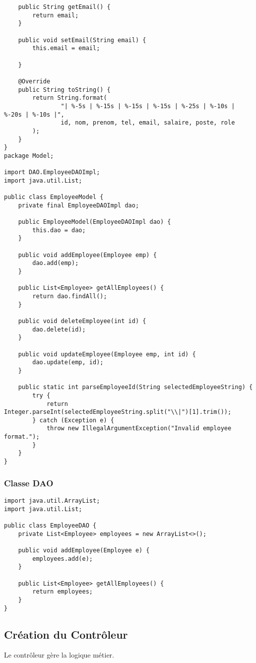 \documentclass[12pt,a4paper]{article}
\begin{document}
\begin{lstlisting}
    public String getEmail() {
        return email;
    }

    public void setEmail(String email) {
        this.email = email;

    }

    @Override
    public String toString() {
        return String.format(
                "| %-5s | %-15s | %-15s | %-15s | %-25s | %-10s | %-20s | %-10s |",
                id, nom, prenom, tel, email, salaire, poste, role
        );
    }
}
package Model;

import DAO.EmployeeDAOImpl;
import java.util.List;

public class EmployeeModel {
    private final EmployeeDAOImpl dao;

    public EmployeeModel(EmployeeDAOImpl dao) {
        this.dao = dao;
    }

    public void addEmployee(Employee emp) {
        dao.add(emp);
    }

    public List<Employee> getAllEmployees() {
        return dao.findAll();
    }

    public void deleteEmployee(int id) {
        dao.delete(id);
    }

    public void updateEmployee(Employee emp, int id) {
        dao.update(emp, id);
    }

    public static int parseEmployeeId(String selectedEmployeeString) {
        try {
            return Integer.parseInt(selectedEmployeeString.split("\\|")[1].trim());
        } catch (Exception e) {
            throw new IllegalArgumentException("Invalid employee format.");
        }
    }
}

\end{lstlisting}

\subsubsection{Classe DAO}
\begin{lstlisting}
import java.util.ArrayList;
import java.util.List;

public class EmployeeDAO {
    private List<Employee> employees = new ArrayList<>();

    public void addEmployee(Employee e) {
        employees.add(e);
    }

    public List<Employee> getAllEmployees() {
        return employees;
    }
}
\end{lstlisting}

\subsection{Création du Contrôleur}
Le contrôleur gère la logique métier.
\end{document}
